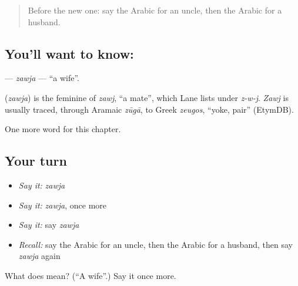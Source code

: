 \label{lesson:AR-C55-zawja}



\begin{quote}
Before the new one: say the Arabic for an uncle, then the Arabic for a husband.
\end{quote}

\subsection*{You'll want to know: }
\textbf{} — \emph{zawja} — \textquotedblleft{}a wife\textquotedblright{}.

\begin{cousinweb}
\textbf{} (\emph{zawja}) is the feminine of \emph{zawj}, \textquotedblleft{}a mate\textquotedblright{}, which Lane lists under \emph{z-w-j}. \emph{Zawj} is usually traced, through Aramaic \emph{zūgā}, to Greek \emph{zeugos}, \textquotedblleft{}yoke, pair\textquotedblright{} (EtymDB).
\end{cousinweb}

\begin{grammarlens}[title={What you've built}]
One more word for this chapter.
\end{grammarlens}

\subsection*{Your turn}
\begin{itemize}
\raggedright
  \item \emph{Say it:} \emph{zawja}
  \item \emph{Say it:} \emph{zawja}, once more
  \item \emph{Say it:} say \emph{zawja}
  \item \emph{Recall:} say the Arabic for an uncle, then the Arabic for a husband, then say \emph{zawja} again
\end{itemize}

\begin{tcolorbox}[breakable,colback=teal!4,colframe=teal!35!black,title={Before you move on}]
What does  mean? (\textquotedblleft{}A wife\textquotedblright{}.) Say it once more.
\end{tcolorbox}
